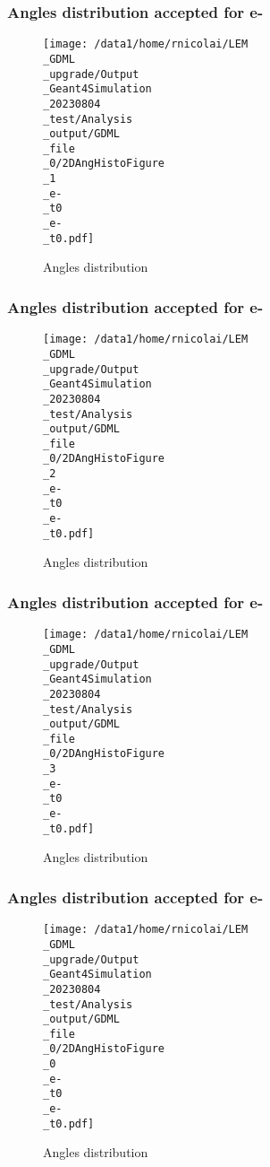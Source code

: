 \documentclass[8pt]{beamer}
\begin{document}
            \begin{frame}
                \frametitle{Angles distribution accepted for e-}
            
        \begin{figure}[h]
            \centering
            \texttt{[image: /data1/home/rnicolai/LEM\\\_GDML\\\_upgrade/Output\\\_Geant4Simulation\\\_20230804\\\_test/Analysis\\\_output/GDML\\\_file\\\_0/2DAngHistoFigure\\\_1\\\_e-\\\_t0\\\_e-\\\_t0.pdf]}
            \caption{Angles distribution}
        \end{figure}
        
            \end{frame}
            
            \begin{frame}
                \frametitle{Angles distribution accepted for e-}
            
        \begin{figure}[h]
            \centering
            \texttt{[image: /data1/home/rnicolai/LEM\\\_GDML\\\_upgrade/Output\\\_Geant4Simulation\\\_20230804\\\_test/Analysis\\\_output/GDML\\\_file\\\_0/2DAngHistoFigure\\\_2\\\_e-\\\_t0\\\_e-\\\_t0.pdf]}
            \caption{Angles distribution}
        \end{figure}
        
            \end{frame}
            
            \begin{frame}
                \frametitle{Angles distribution accepted for e-}
            
        \begin{figure}[h]
            \centering
            \texttt{[image: /data1/home/rnicolai/LEM\\\_GDML\\\_upgrade/Output\\\_Geant4Simulation\\\_20230804\\\_test/Analysis\\\_output/GDML\\\_file\\\_0/2DAngHistoFigure\\\_3\\\_e-\\\_t0\\\_e-\\\_t0.pdf]}
            \caption{Angles distribution}
        \end{figure}
        
            \end{frame}
            
            \begin{frame}
                \frametitle{Angles distribution accepted for e-}
            
        \begin{figure}[h]
            \centering
            \texttt{[image: /data1/home/rnicolai/LEM\\\_GDML\\\_upgrade/Output\\\_Geant4Simulation\\\_20230804\\\_test/Analysis\\\_output/GDML\\\_file\\\_0/2DAngHistoFigure\\\_0\\\_e-\\\_t0\\\_e-\\\_t0.pdf]}
            \caption{Angles distribution}
        \end{figure}
        
            \end{frame}
            
\end{document}
